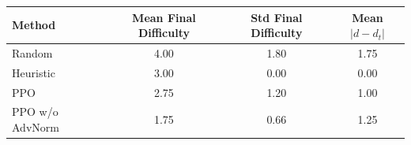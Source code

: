 \begin{tabular}{lccc}
\toprule
Method & Mean Final Difficulty & Std Final Difficulty & Mean $|d-d_t|$ \\
\midrule
Random & 4.00 & 1.80 & 1.75 \\
Heuristic & 3.00 & 0.00 & 0.00 \\
PPO & 2.75 & 1.20 & 1.00 \\
PPO w/o AdvNorm & 1.75 & 0.66 & 1.25 \\
\bottomrule
\end{tabular}
